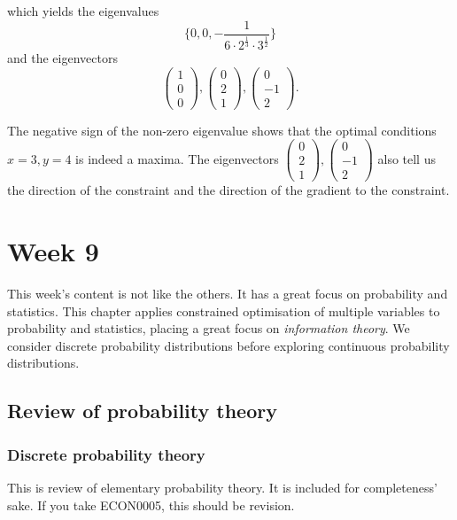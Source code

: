 \documentclass[a4paper, 12pt,oneside,openany]{book}
\begin{document}
{	which yields the eigenvalues $$\{0, 0, -\frac{1}{6 \cdot 2^{\frac{1}{3}} \cdot 3^{\frac{1}{2}}} \}$$ and the eigenvectors $$\begin{pmatrix} 1 \\0\\0 \end{pmatrix},\begin{pmatrix} 0 \\2\\1 \end{pmatrix},\begin{pmatrix} 0 \\-1\\2 \end{pmatrix}.$$
	
	The negative sign of the non-zero eigenvalue shows that the optimal conditions $x=3, y=4$ is indeed a maxima. The eigenvectors $\begin{pmatrix} 0 \\2\\1 \end{pmatrix},\begin{pmatrix} 0 \\-1\\2 \end{pmatrix}$ also tell us the direction of the constraint and the direction of the gradient to the constraint.
}

\chapter{Week 9}

This week's content is not like the others. It has a great focus on probability and statistics. This chapter applies constrained optimisation of multiple variables to probability and statistics, placing a great focus on \emph{information theory}. We consider discrete probability distributions before exploring continuous probability distributions.

\section{Review of probability theory}

\subsection{Discrete probability theory}

This is review of elementary probability theory. It is included for completeness' sake. If you take ECON0005, this should be revision.
\end{document}
